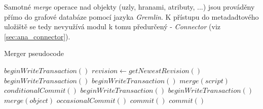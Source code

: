 Samotné \textit{merge} operace nad objekty (uzly, hranami, atributy, ...) jsou prováděny přímo do grafové databáze pomocí jazyka \textit{Gremlin}. K přístupu do metadadtového uložiště se tedy nevyužívá modul k tomu předurčený - \textit{Connector} (viz \ref{sec:ana_connector}).

\begin{algorithm} 
\caption{Merger pseudocode}
\label{alg_merger}
\begin{algorithmic}
	\State $beginWriteTransaction()$
	\State $revision\gets getNewestRevision()$
		\State $beginWriteTransaction()$
			\State $beginWriteTransaction()$
			\State $merge(script)$	
			\State $conditionalCommit()$
		\EndFor
		\State $beginWriteTransaction()$
			\State $beginWriteTransaction()$
			\State $merge(object)$	
			\State $occasionalCommit()$
		\EndFor
		\State $commit()$	
	\EndIf
	\State $commit()$
\end{algorithmic}
\end{algorithm}




